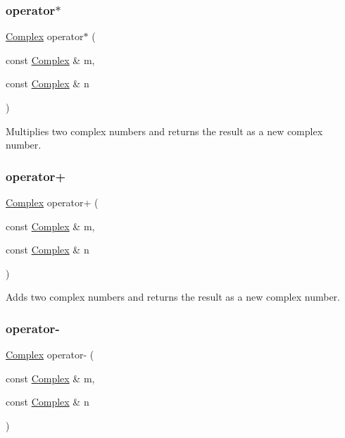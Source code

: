 \subsubsection{\texorpdfstring{operator$\ast$}{operator*}}
{\footnotesize\ttfamily \mbox{\hyperlink{classComplex}{Complex}} operator$\ast$ (\begin{DoxyParamCaption}\item[{const \mbox{\hyperlink{classComplex}{Complex}} \&}]{m,  }\item[{const \mbox{\hyperlink{classComplex}{Complex}} \&}]{n }\end{DoxyParamCaption})\hspace{0.3cm}{\ttfamily [friend]}}



Multiplies two complex numbers and returns the result as a new complex number. 

\mbox{\label{classComplex_a47f36e8ddc742de052086d653d7b8e04}} 
\subsubsection{\texorpdfstring{operator+}{operator+}}
{\footnotesize\ttfamily \mbox{\hyperlink{classComplex}{Complex}} operator+ (\begin{DoxyParamCaption}\item[{const \mbox{\hyperlink{classComplex}{Complex}} \&}]{m,  }\item[{const \mbox{\hyperlink{classComplex}{Complex}} \&}]{n }\end{DoxyParamCaption})\hspace{0.3cm}{\ttfamily [friend]}}



Adds two complex numbers and returns the result as a new complex number. 

\mbox{\label{classComplex_ab2328f9c33b801e1ab56ee119493440f}} 
\subsubsection{\texorpdfstring{operator-\/}{operator-}}
{\footnotesize\ttfamily \mbox{\hyperlink{classComplex}{Complex}} operator-\/ (\begin{DoxyParamCaption}\item[{const \mbox{\hyperlink{classComplex}{Complex}} \&}]{m,  }\item[{const \mbox{\hyperlink{classComplex}{Complex}} \&}]{n }\end{DoxyParamCaption})\hspace{0.3cm}{\ttfamily [friend]}}



